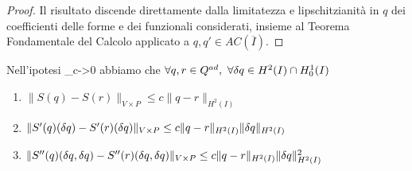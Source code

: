 \begin{proof}
	Il risultato discende direttamente dalla limitatezza e lipschitzianità in $q$ dei coefficienti delle forme e dei funzionali considerati, insieme al Teorema Fondamentale del Calcolo applicato a $q,q'\in AC(\overline{I})$.
\end{proof}
%
\begin{lemma}
	Nell'ipotesi
	\beq
		\alpha_c->0
	\label{eq:Hpcoeff}
	\eeq
	abbiamo che $\forall q,r\in Q^{ad},\ \forall{\delta q}\in H^2(I)\cap H^1_0(I)$
	\begin{enumerate}
	\item $\|S(q)-S(r)\|_{V\times P}\leq c\|q-r\|_{H^2(I)}$
	\item $\|S'(q)({\delta q})-S'(r)({\delta q})\|_{V\times P}\leq c\|q-r\|_{H^2(I)}\|{\delta q}\|_{H^2(I)}$
	\item $\|S''(q)({\delta q},{\delta q})-S''(r)({\delta q},{\delta q})\|_{V\times P}\leq c\|q-r\|_{H^2(I)}\|{\delta q}\|_{H^2(I)}^2$
	\end{enumerate}
\label{th:SLip}
\end{lemma}
